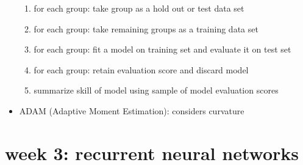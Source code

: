 \documentclass[10pt]{article}
\begin{document}
\begin{itemize}[label=\(\star\), leftmargin=1em, itemsep=-0.3em]
\begin{enumerate}[leftmargin=1em, itemsep=-0.3em]
            \item for each group: take group as a hold out or test data set
            \item for each group: take remaining groups as a training data set
            \item for each group: fit a model on training set and evaluate it on test set
            \item for each group: retain evaluation score and discard model
            \item summarize skill of model using sample of model evaluation scores
        \end{enumerate}
    \item ADAM (Adaptive Moment Estimation): considers curvature
\end{itemize}

\pagebreak
\section*{week 3: recurrent neural networks}
\end{document}
